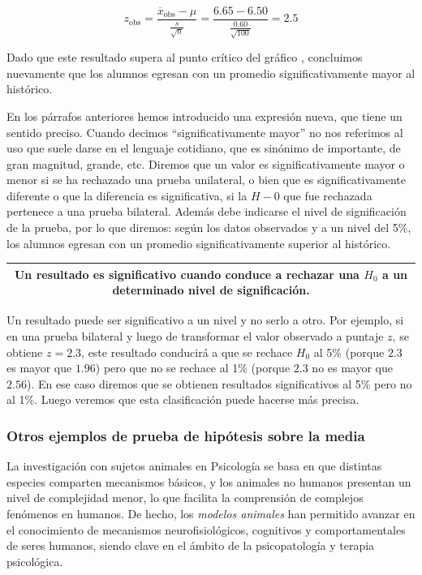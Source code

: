 \documentclass[]{book}
\begin{document}
\[z_{\text{obs}} = \frac{{\overline{x}}_{\text{obs}} - \mu}{\frac{s}{\sqrt{n}}} = \frac{6.65 - 6.50}{\frac{0.60}{\sqrt{100}}} = 2.5\]

Dado que este resultado supera al punto crítico del gráfico , concluimos nuevamente que los alumnos egresan con un promedio significativamente mayor al histórico.

En los párrafos anteriores hemos introducido una expresión nueva, que
tiene un sentido preciso. Cuando decimos ``significativamente mayor'' no
nos referimos al uso que suele darse en el lenguaje cotidiano, que es
sinónimo de importante, de gran magnitud, grande, etc. Diremos que un
valor es significativamente mayor o menor si se ha rechazado una prueba
unilateral, o bien que es significativamente diferente o que la
diferencia es significativa, si la \(H-{0}\) que fue rechazada pertenece a una prueba bilateral. Además debe indicarse el nivel de significación de la prueba, por lo que diremos: según los datos observados y a un nivel del 5\%, los alumnos egresan con un promedio significativamente superior al histórico.

\begin{longtable}[]{@{}c@{}}
\toprule
\endhead
\begin{minipage}[t]{0.97\columnwidth}\centering
Un resultado es \textbf{significativo} cuando conduce a rechazar una \(H_{0}\) a un determinado nivel de significación.\strut
\end{minipage}\tabularnewline
\bottomrule
\end{longtable}

Un resultado puede ser significativo a un nivel y no serlo a otro. Por
ejemplo, si en una prueba bilateral y luego de transformar el valor
observado a puntaje \(z\), se obtiene \(z=2.3\), este resultado conducirá a que se rechace \(H_{0}\) al 5\% (porque \(2.3\) es mayor que \(1.96\)) pero que no se rechace al 1\% (porque \(2.3\) no es mayor que \(2.56\)). En ese caso diremos que se obtienen resultados significativos al 5\% pero no al 1\%. Luego veremos que esta clasificación puede hacerse más precisa.

\hypertarget{otros-ejemplos-de-prueba-de-hipuxf3tesis-sobre-la-media}{%
\subsubsection{Otros ejemplos de prueba de hipótesis sobre la media}\label{otros-ejemplos-de-prueba-de-hipuxf3tesis-sobre-la-media}}

La investigación con sujetos animales en Psicología se basa en que
distintas especies comparten mecanismos básicos, y los animales no
humanos presentan un nivel de complejidad menor, lo que facilita la
comprensión de complejos fenómenos en humanos. De hecho, los \emph{modelos
animales} han permitido avanzar en el conocimiento de mecanismos
neurofisiológicos, cognitivos y comportamentales de seres humanos,
siendo clave en el ámbito de la psicopatología y terapia psicológica.
\end{document}
